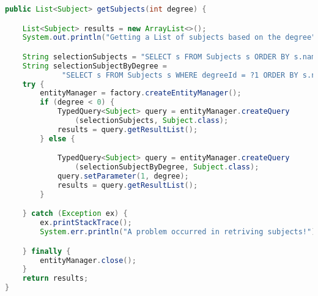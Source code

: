 \begin{lstlisting}[language=Java,  basicstyle=\footnotesize]
public List<Subject> getSubjects(int degree) {

	List<Subject> results = new ArrayList<>();
	System.out.println("Getting a List of subjects based on the degree");

	String selectionSubjects = "SELECT s FROM Subjects s ORDER BY s.name";
	String selectionSubjectByDegree =
			 "SELECT s FROM Subjects s WHERE degreeId = ?1 ORDER BY s.name";
	try {
		entityManager = factory.createEntityManager();
		if (degree < 0) {
			TypedQuery<Subject> query = entityManager.createQuery
				(selectionSubjects, Subject.class);
			results = query.getResultList();
		} else {

			TypedQuery<Subject> query = entityManager.createQuery
				(selectionSubjectByDegree, Subject.class);
			query.setParameter(1, degree);
			results = query.getResultList();
		}

	} catch (Exception ex) {
		ex.printStackTrace();
		System.err.println("A problem occurred in retriving subjects!");

	} finally {
		entityManager.close();
	}
	return results;
}
\end{lstlisting}